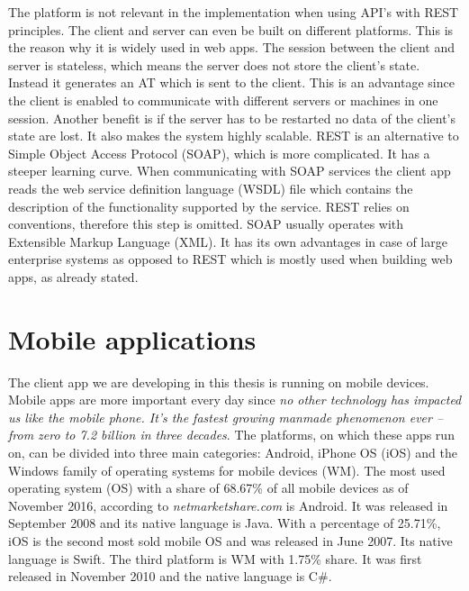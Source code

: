 The platform is not relevant in the implementation when using API's with REST principles. The client and server can even be built on different platforms. This is the reason why it is widely used in web apps. The session between the client and server is stateless, which means the server does not store the client's state. Instead it generates an AT which is sent to the client. This is an advantage since the client is enabled to communicate with different servers or machines in one session. Another benefit is if the server has to be restarted no data of the client's state are lost. It also makes the system highly scalable. REST is an alternative to Simple Object Access Protocol (SOAP), which is more complicated. It has a steeper learning curve. When communicating with SOAP services the client app reads the web service definition language (WSDL) file which contains the description of the functionality supported by the service. REST relies on conventions, therefore this step is omitted. SOAP usually operates with Extensible Markup Language (XML). It has its own advantages in case of large enterprise systems as opposed to REST which is mostly used when building web apps, as already stated.

\section{Mobile applications} \label{analysisMobileApplications}
The client app we are developing in this thesis is running on mobile devices. Mobile apps are more important every day since \textit{no other technology has impacted us like the mobile phone. It's the fastest growing manmade phenomenon ever -- from zero to 7.2 billion in three decades}\cite{more-gadgets-on-earth-than-people}. The platforms, on which these apps run on, can be divided into three main categories: Android, iPhone OS (iOS) and the Windows family of operating systems for mobile devices (WM). The most used operating system (OS) with a share of 68.67\% of all mobile devices as of November 2016, according to \textit{netmarketshare.com} \cite{operating-system-market-share} is Android. It was  released in September 2008 and its native language is Java. With a percentage of 25.71\%, iOS is the second most sold mobile OS and was released in June 2007. Its native language is Swift. The third platform is WM with 1.75\% share. It was first released in November 2010 and the native language is C\#. 

